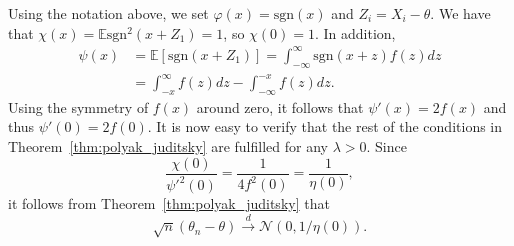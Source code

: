 \documentclass[letterpaper, 11pt]{IEEEtran}      %
\newcommand{\ex}[1]{\ensuremath{\mathbb{E}\left[ #1\right]}}
\newcommand{\sgn}{\mathrm{sgn} }
\newcommand{\Ncal}{\mathcal{N}}
\begin{document}
Using the notation above, we set $\varphi(x) = \sgn(x)$ and $Z_i = X_i - \theta$. We have that $\chi(x) = \mathbb E \sgn^2(x+Z_1) = 1$, so $\chi(0) = 1$. In addition,
\begin{align*}
\psi(x) & = \ex{ \sgn(x+ Z_1) }= \int_{-\infty}^\infty \sgn(x+z) f(z) dz \\
& = \int_{-x}^\infty f(z) dz -\int_{-\infty}^{-x} f(z) dz. 
\end{align*}
Using the symmetry of $f(x)$ around zero, it follows that $\psi'(x) = 2f(x)$ and thus $\psi'(0) = 2f(0)$. It is now easy to verify that the rest of the conditions in Theorem~\ref{thm:polyak_juditsky} are fulfilled for any $\lambda > 0$. Since 
\[
\frac{\chi(0)}{\psi'^2(0)} = \frac{1}{4 f^2(0)} = \frac{1}{\eta(0)},
\]
it follows from Theorem~\ref{thm:polyak_juditsky} that
\[
\sqrt{n}\left({\theta}_n-\theta \right) \overset{d}{\to} \Ncal \left(0, 1/ \eta(0)\right). 
\]
\end{document}

